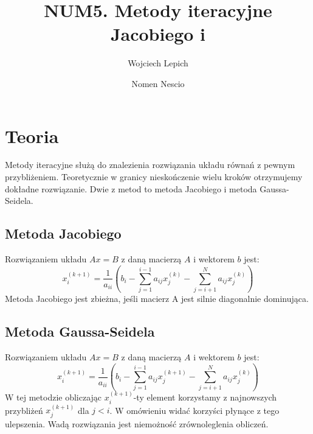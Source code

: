 \documentclass[a4paper,11pt]{article}
\author{Wojciech Lepich \and Nomen Nescio}
\title{NUM5. Metody iteracyjne Jacobiego i \nolinebreak{Gaussa-Seidela}}
\begin{document}
\maketitle
\section{Teoria}
Metody iteracyjne służą do znalezienia rozwiązania układu równań z pewnym przybliżeniem.
Teoretycznie w granicy nieskończenie wielu kroków otrzymujemy dokładne rozwiązanie.
Dwie z metod to metoda Jacobiego i metoda Gaussa-Seidela.

\subsection{Metoda Jacobiego}
Rozwiązaniem układu \(Ax = B\) z daną macierzą \(A\) i wektorem \(b\) jest:
\[ x_{i}^{(k+1)} = \frac{1}{a_{ii}}(b_{i} - \sum_{j=1}^{i-1}a_{ij}x_{j}^{(k)} 
- \sum_{j=i+1}^{N}a_{ij}x_{j}^{(k)}) \]
Metoda Jacobiego jest zbieżna, jeśli macierz A jest silnie diagonalnie dominująca.

\subsection{Metoda Gaussa-Seidela}
Rozwiązaniem układu \(Ax = B\) z daną macierzą \(A\) i wektorem \(b\) jest:
\[ x_{i}^{(k+1)} = \frac{1}{a_{ii}}(b_{i}-\sum_{j=1}^{i-1}a_{ij}x_{j}^{(k+1)} - 
\sum_{j=i+1}^{N}a_{ij}x_{j}^{(k)}) \]
W tej metodzie obliczając \(x_{i}^{(k+1)}\)-ty element korzystamy z najnowszych przybliżeń 
\(x_{j}^{(k+1)}\) dla \(j<i\). W omówieniu widać korzyści płynące z tego ulepszenia. Wadą 
rozwiązania jest niemożność zrównoleglenia obliczeń.
\end{document}

